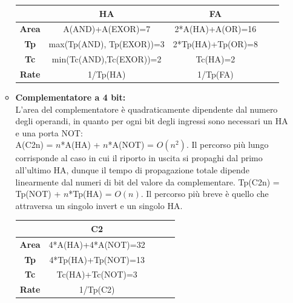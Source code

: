 \documentclass[10pt]{article}
\begin{document}
\begin{itemize}
\begin{itemize}
    \begin{table}[H]
        \begin{minipage}[c]{\textwidth}
        \centering
        \begin{tabular}{|c|c|c|c|c|}
        \hline
                      & \textbf{HA}              & \textbf{FA}       \\ \hline
        \textbf{Area} & A(AND)+A(EXOR)=7         & 2*A(HA)+A(OR)=16  \\ 
        \textbf{Tp}   & max(Tp(AND), Tp(EXOR))=3 & 2*Tp(HA)+Tp(OR)=8 \\ 
        \textbf{Tc}   & min(Tc(AND),Tc(EXOR))=2  & Tc(HA)=2          \\ 
        \textbf{Rate} & 1/Tp(HA)                 & 1/Tp(FA)          \\ \hline
        \end{tabular}
    \end{minipage}
    \end{table}

\item \textbf{Complementatore a 4 bit:}\\
    L'area del complementatore è quadraticamente dipendente dal numero degli operandi, in quanto per ogni bit degli ingressi sono necessari un HA e una porta NOT:\\
    A(C2n) = $n$*A(HA) + $n$*A(NOT) = $O(n^2)$.
    Il percorso più lungo corrisponde al caso in cui il riporto in uscita si propaghi dal primo all'ultimo HA, dunque il tempo di propagazione totale dipende linearmente dal numeri di bit del valore
    da complementare.
    Tp(C2n) = Tp(NOT) + $n$*Tp(HA) = $O(n)$.
    Il percorso più breve è quello che attraversa un singolo invert e un singolo HA.
    
    \begin{table}[H]
        \begin{minipage}[c]{\textwidth}
        \centering
        \begin{tabular}{|c|c|c|c|c|}
        \hline
                      & \textbf{C2}           \\ \hline
        \textbf{Area} & 4*A(HA)+4*A(NOT)=32   \\ 
        \textbf{Tp}   & 4*Tp(HA)+Tp(NOT)=13   \\ 
        \textbf{Tc}   & Tc(HA)+Tc(NOT)=3      \\ 
        \textbf{Rate} & 1/Tp(C2)              \\ \hline
        \end{tabular}
    \end{minipage}
    \end{table}
    

\end{itemize}
\end{itemize}
\end{document}
